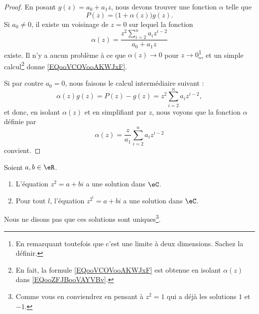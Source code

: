 \begin{proof}
	En posant \( g(z)=a_0+a_1z\), nous devons trouver une fonction \( \alpha\) telle que
	\begin{equation}        \label{EQooZFJBooVAYVBv}
		P(z)=\big( 1+\alpha(z) \big)g(z).
	\end{equation}
	Si \( a_0\neq 0\), il existe un voisinage de \( z=0\) sur lequel la fonction
	\begin{equation}        \label{EQooVCOVooAKWJxF}
		\alpha(z)=\frac{ z^2\sum_{i=2}^na_iz^{i-2} }{ a_0+a_1z }
	\end{equation}
	existe. Il n'y a aucun problème à ce que \( \alpha(z)\to 0\) pour \( z\to 0\)\footnote{En remarquant toutefois que c'est une limite à deux dimensions. Sachez la définir.}, et un simple calcul\footnote{En fait, la formule \eqref{EQooVCOVooAKWJxF} est obtenue en isolant \( \alpha(z)\) dans \eqref{EQooZFJBooVAYVBv}.} donne \eqref{EQooVCOVooAKWJxF}.

	Si par contre \( a_0=0\), nous faisons le calcul intermédiaire suivant :
	\begin{equation}
		\alpha(z)g(z)=P(z)-g(z)=z^2\sum_{i=2}^na_iz^{i-2},
	\end{equation}
	et donc, en isolant \( \alpha(z)\) et en simplifiant par \( z\), nous voyons que la fonction \( \alpha\) définie par
	\begin{equation}
		\alpha(z)=\frac{z}{ a_1 }\sum_{i=2}^na_iz^{i-2}
	\end{equation}
	convient.
\end{proof}

\begin{proposition}       \label{PROPooLBBLooQwEiHr}
	Soient \( a,b\in \eR\).
	\begin{enumerate}
		\item       \label{ITEMooSPSWooKLtqzZ}
		      L'équation \( z^2=a+bi\) a une solution dans \( \eC\).
		\item       \label{ITEMooQOJDooWjfGXv}
		      Pour tout \( l\), l'équation \( z^{2^l}=a+bi\) a une solution dans \( \eC\).
	\end{enumerate}
	Nous ne disons pas que ces solutions sont uniques\footnote{Comme vous en conviendrez en pensant à \( z^2=1\) qui a déjà les solutions \( 1\) et \( -1\).}.
\end{proposition}


